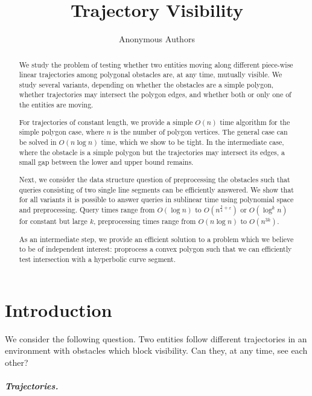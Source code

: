 \documentclass[UKenglish]{lipics-v2019}
\title{Trajectory Visibility}
\author{Anonymous Authors}{Anonymous Affiliations}{}{}{}
\newcommand{\eps}{\ensuremath{\varepsilon}\xspace}
\begin{document}
\maketitle

\begin{abstract}
  We study the problem of testing whether two entities moving along different piece-wise linear trajectories among polygonal obstacles are, at any time, mutually visible.
  We study several variants, depending on whether the obstacles are a simple polygon, whether trajectories may intersect the polygon edges, and whether both or only one of the entities are moving.
  
  For trajectories of constant length, we provide a simple $O(n)$ time algorithm for the simple polygon case, where $n$ is the number of polygon vertices.
  The general case can be solved in $O(n \log n)$ time, which we show to be tight.
  In the intermediate case, where the obstacle is a simple polygon but the trajectories may intersect its edges, a small gap between the lower and upper bound remains.
  
  Next, we consider the data structure question of preprocessing the obstacles such that queries consisting of two single line segments can be efficiently answered.
  We show that for all variants it is possible to answer queries in sublinear time using polynomial space and preprocessing. 
  Query times range from $O(\log n)$ to $O(n^{\frac34 + \eps})$ or $O(\log^k n)$ for constant but large $k$,
  preprocessing times range from $O(n \log n)$ to $O(n^{3k})$.
  
  As an intermediate step, we provide an efficient solution to a problem which we believe to be of independent interest: proprocess a convex polygon such that we can efficiently test intersection with a hyperbolic curve segment.
\end{abstract}





\newpage


\section {Introduction}

We consider the following question. Two entities follow different trajectories in an environment with obstacles which block visibility. Can they, at any time, see each other? 

\subparagraph {Trajectories.}
\end{document}

